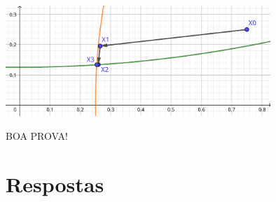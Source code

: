 \documentclass[12pt,a4paper]{article}
\begin{document}
\begin{ExerciseList}
\begin{center}
  \includegraphics[width=10.0cm]{img/5-sistema-não-linear-2x2-iteração-ponto-fixo-sequência.pdf}
\end{center}
\end{ExerciseList}

\begin{center}
BOA PROVA!
\end{center}

\newpage
\restoregeometry
\section*{Respostas}
\shipoutAnswer
\end{document}
